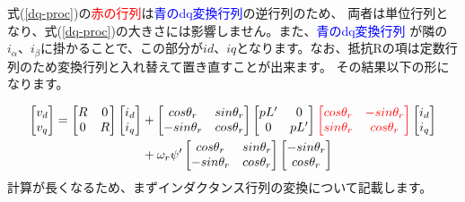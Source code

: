 式(\ref{dq-proc})の\textcolor{red}{赤の行列}は\textcolor{blue}{青のdq変換行列}の逆行列のため、
両者は単位行列となり、式(\ref{dq-proc})の大きさには影響しません。また、\textcolor{blue}{青のdq変換行列}
が隣の$i_{\alpha}、i_{\beta}$に掛かることで、この部分が$id、iq$となります。なお、抵抗Rの項は定数行列のため変換行列と入れ替えて置き直すことが出来ます。
その結果以下の形になります。
\begin{fleqn}[8pt]
{\large
\begin{align*}
    \begin{bmatrix}
        v_{d} \\
        v_{q}
    \end{bmatrix}
    =
    \begin{bmatrix}
        R & 0 \\
        0 & R
    \end{bmatrix}
    \begin{bmatrix}
        i_{d} \\
        i_{q}
    \end{bmatrix}
    &+
    \begin{bmatrix}
        cos\theta_{r} & sin\theta_{r} \\
        -sin\theta_{r} & cos\theta_{r}
    \end{bmatrix}
    \begin{bmatrix}
        pL' & 0 \\
        0 & pL'
    \end{bmatrix}
    \textcolor{red}{
    \begin{bmatrix}
        cos\theta_{r} & -sin\theta_{r} \\
        sin\theta_{r} & cos\theta_{r}
    \end{bmatrix}}
    \begin{bmatrix}
        i_{d} \\
        i_{q}
    \end{bmatrix}
    \\
    &+ \omega_{r}\psi'
    \begin{bmatrix}
        cos\theta_{r} & sin\theta_{r} \\
        -sin\theta_{r} & cos\theta_{r}
    \end{bmatrix}
    \begin{bmatrix}
        -sin\theta_{r} \\
        cos\theta_{r}
    \end{bmatrix}
\end{align*}
}
計算が長くなるため、まずインダクタンス行列の変換について記載します。
{\large
}
\end{fleqn}
